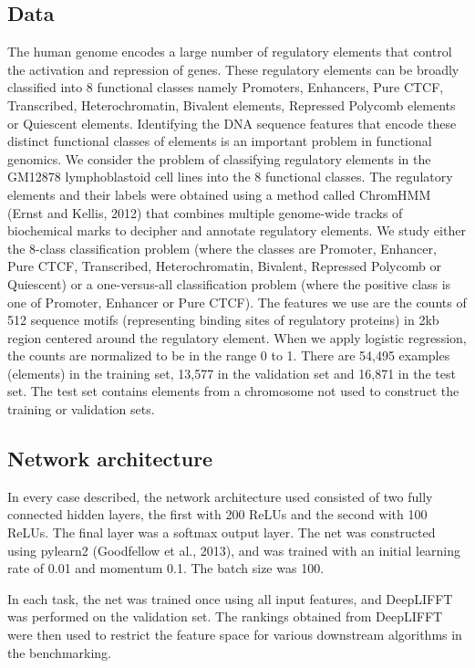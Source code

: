 \documentclass{article}
\begin{document}
\subsection{Data}
The human genome encodes a large number of regulatory elements that control the activation and repression of genes. These regulatory elements can be broadly classified into 8 functional classes namely Promoters, Enhancers, Pure CTCF, Transcribed, Heterochromatin, Bivalent elements, Repressed Polycomb elements or Quiescent elements. Identifying the DNA sequence features that encode these distinct functional classes of elements is an important problem in functional genomics. We consider the problem of classifying regulatory elements in the GM12878 lymphoblastoid cell lines into the 8 functional classes. The regulatory elements and their labels were obtained using a method called ChromHMM (Ernst and Kellis, 2012) that combines multiple genome-wide tracks of biochemical marks to decipher and annotate regulatory elements. We study either the 8-class classification problem (where the classes are Promoter, Enhancer, Pure CTCF, Transcribed, Heterochromatin, Bivalent, Repressed Polycomb or Quiescent) or a one-versus-all classification problem (where the positive class is one of Promoter, Enhancer or Pure CTCF). The features we use are the counts of 512 sequence motifs (representing binding sites of regulatory proteins) in 2kb region centered around the regulatory element. When we apply logistic regression, the counts are normalized to be in the range 0 to 1. There are 54,495 examples (elements) in the training set, 13,577 in the validation set and 16,871 in the test set. The test set contains elements from a chromosome not used to construct the training or validation sets.

\subsection{Network architecture}
In every case described, the network architecture used consisted of two fully connected hidden layers, the first with 200 ReLUs and the second with 100 ReLUs. The final layer was a softmax output layer. The net was constructed using pylearn2 (Goodfellow et al., 2013), and was trained with an initial learning rate of 0.01 and momentum 0.1. The batch size was 100.

In each task, the net was trained once using all input features, and DeepLIFFT was performed on the validation set. The rankings obtained from DeepLIFFT were then used to restrict the feature space for various downstream algorithms in the benchmarking.
\end{document}
